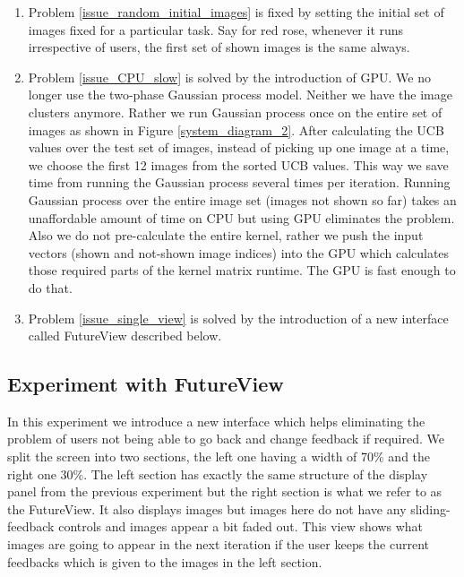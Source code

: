 \documentclass[english]{tktltiki}
\begin{document}
\begin{enumerate}
	\item Problem \ref{issue_random_initial_images} is fixed by setting the initial set of images fixed for a particular task. Say for red rose, whenever it runs irrespective of users, the first set of shown images is the same always.
	\item Problem \ref{issue_CPU_slow} is solved by the introduction of GPU. We no longer use the two-phase Gaussian process model. Neither we have the image clusters anymore. Rather we run Gaussian process once on the entire set of images as shown in Figure \ref{system_diagram_2}. After calculating the UCB values over the test set of images, instead of picking up one image at a time, we choose the first 12 images from the sorted UCB values. This way we save time from running the Gaussian process several times per iteration. Running Gaussian process over the entire image set (images not shown so far) takes an unaffordable amount of time on CPU but using GPU eliminates the problem. Also we do not pre-calculate the entire kernel, rather we push the input vectors (shown and not-shown image indices) into the GPU which calculates those required parts of the kernel matrix runtime. The GPU is fast enough to do that.
	\item Problem \ref{issue_single_view} is solved by the introduction of a new interface called FutureView described below.
 
\end{enumerate}


\subsection{Experiment with FutureView}

In this experiment we introduce a new interface which helps eliminating the problem of users not being able to go back and change feedback if required. We split the screen into two sections, the left one having a width of 70\% and the right one 30\%. The left section has exactly the same structure of the display panel from the previous experiment but the right section is what we refer to as the FutureView. It also displays images but images here do not have any sliding-feedback controls and images appear a bit faded out. This view shows what images are going to appear in the next iteration if the user keeps the current feedbacks which is given to the images in the left section.
\end{document}

